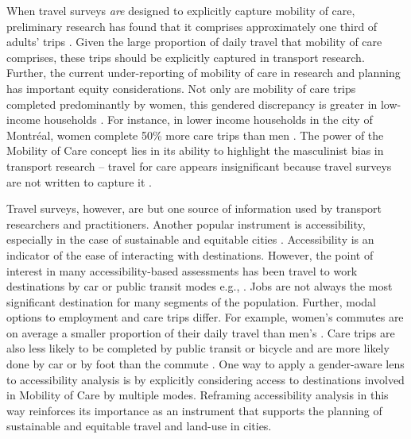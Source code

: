 \documentclass[
  authoryear,
  preprint,
  3p]{elsarticle}
\begin{document}
When travel surveys \emph{are} designed to explicitly capture mobility
of care, preliminary research has found that it comprises approximately
one third of adults' trips
\citep{gomezvaroAccountingCareEveryday2023, sanchezdemadariagaMobilityCareIntroducing2013, sanchezdemadariagaMeasuringMobilitiesCare2019, ravensbergenExploratoryAnalysisMobility2022, murillomunarCaregiversMoveGender2023}.
Given the large proportion of daily travel that mobility of care
comprises, these trips should be explicitly captured in transport
research. Further, the current under-reporting of mobility of care in
research and planning has important equity considerations. Not only are
mobility of care trips completed predominantly by women, this gendered
discrepancy is greater in low-income households
\citep{murillomunarCaregiversMoveGender2023, sanchezdemadariagaMobilityCareIntroducing2013, ravensbergenExploratoryAnalysisMobility2022}.
For instance, in lower income households in the city of Montréal, women
complete 50\% more care trips than men
\citep{ravensbergenExploratoryAnalysisMobility2022}. The power of the
Mobility of Care concept lies in its ability to highlight the
masculinist bias in transport research -- travel for care appears
insignificant because travel surveys are not written to capture it
\citep{sanchezdemadariagaMobilityCareIntroducing2013}.

Travel surveys, however, are but one source of information used by
transport researchers and practitioners. Another popular instrument is
accessibility, especially in the case of sustainable and equitable
cities
\citep{ryanAccessibilitySpaceTime2023, bertoliniSustainableAccessibilityConceptual2005}.
Accessibility is an indicator of the ease of interacting with
destinations. However, the point of interest in many accessibility-based
assessments has been travel to work destinations by car or public
transit modes e.g.,
\citep{kelobonyeRelativeAccessibilityAnalysis2019, farberOntarioLineSocioeconomic2019, duarteInfluenceJobAccessibility2023, ryanAccessibilitySpaceTime2023}.
Jobs are not always the most significant destination for many segments
of the population. Further, modal options to employment and care trips
differ. For example, women's commutes are on average a smaller
proportion of their daily travel than men's
\citep{ravensbergenExploratoryAnalysisMobility2022}. Care trips are also
less likely to be completed by public transit or bicycle and are more
likely done by car or by foot than the commute
\citep{ravensbergenExploratoryAnalysisMobility2022}. One way to apply a
gender-aware lens to accessibility analysis is by explicitly considering
access to destinations involved in Mobility of Care by multiple modes.
Reframing accessibility analysis in this way reinforces its importance
as an instrument that supports the planning of sustainable and equitable
travel and land-use in cities.
\end{document}
